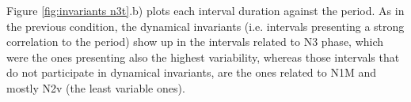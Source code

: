 Figure \ref{fig:invariants n3t}.b) plots each interval duration against the period. As in the previous condition, the dynamical invariants (i.e. intervals presenting a strong correlation to the period) show up in the intervals related to N3 phase, which were the ones presenting also the highest variability, whereas those intervals that do not participate in dynamical invariants, are the ones related to N1M and mostly N2v (the least variable ones). 




